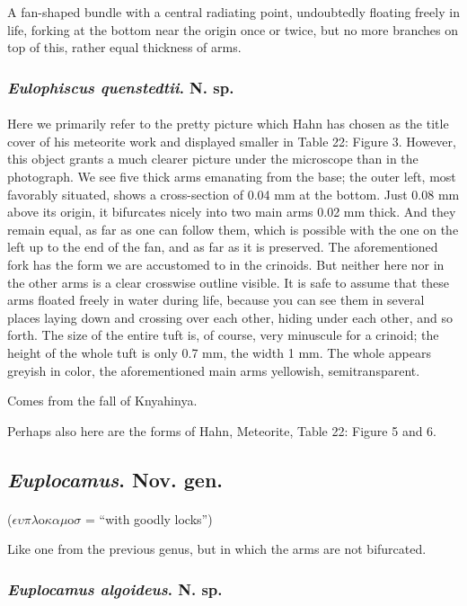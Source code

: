 \documentclass[a4paper, 12pt, oneside]{article}
\begin{document}
A fan-shaped bundle with a central radiating point, undoubtedly floating freely in life, forking at the bottom near the origin once or twice, but no more branches on top of this, rather equal thickness of arms.
\subsubsection{\emph{Eulophiscus quenstedtii}. N. sp.}
\paragraph{}
Here we primarily refer to the pretty picture which Hahn has chosen as the title cover of his meteorite work and displayed smaller in Table 22: Figure 3. However, this object grants a much clearer picture under the microscope than in the photograph. We see five thick arms emanating from the base; the outer left, most favorably situated, shows a cross-section of 0.04 mm at the bottom. Just 0.08 mm above its origin, it bifurcates nicely into two main arms 0.02 mm thick. And they remain equal, as far as one can follow them, which is possible with the one on the left up to the end of the fan, and as far as it is preserved. The aforementioned fork has the form we are accustomed to in the crinoids. But neither here nor in the other arms is a clear crosswise outline visible. It is safe to assume that these arms floated freely in water during life, because you can see them in several places laying down and crossing over each other, hiding under each other, and so forth. The size of the entire tuft is, of course, very minuscule for a crinoid; the height of the whole tuft is only 0.7 mm, the width 1 mm. The whole appears greyish in color, the aforementioned main arms yellowish, semitransparent.

Comes from the fall of Knyahinya.

Perhaps also here are the forms of Hahn, Meteorite, Table 22: Figure 5 and 6.
\subsection{\emph{Euplocamus}. Nov. gen.}
\paragraph{}
($\epsilon\upsilon\pi\lambda$o$\kappa\alpha\mu$o$\sigma$ = ``with goodly locks'')%

Like one from the previous genus, but in which the arms are not bifurcated.
\subsubsection{\emph{Euplocamus algoideus}. N. sp.}
\end{document}
